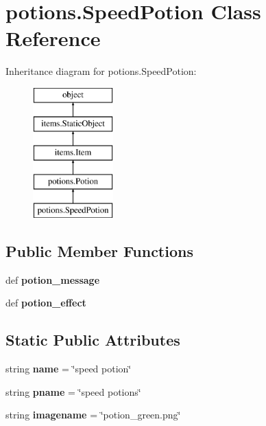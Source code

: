 \hypertarget{classpotions_1_1_speed_potion}{}\section{potions.\+Speed\+Potion Class Reference}
\label{classpotions_1_1_speed_potion}
Inheritance diagram for potions.\+Speed\+Potion\+:\begin{figure}[H]
\begin{center}
\leavevmode
\includegraphics[height=5.000000cm]{classpotions_1_1_speed_potion}
\end{center}
\end{figure}
\subsection*{Public Member Functions}
\begin{DoxyCompactItemize}
\item 
\hypertarget{classpotions_1_1_speed_potion_ad9eb0d697d01058de252d7c3b5cdd31d}{}def {\bfseries potion\+\_\+message}\label{classpotions_1_1_speed_potion_ad9eb0d697d01058de252d7c3b5cdd31d}

\item 
\hypertarget{classpotions_1_1_speed_potion_aebb1c2b45bcd48a039b1ceeedea9c14d}{}def {\bfseries potion\+\_\+effect}\label{classpotions_1_1_speed_potion_aebb1c2b45bcd48a039b1ceeedea9c14d}

\end{DoxyCompactItemize}
\subsection*{Static Public Attributes}
\begin{DoxyCompactItemize}
\item 
\hypertarget{classpotions_1_1_speed_potion_a4a7ff1a8b288e86f1d858d438794a7d8}{}string {\bfseries name} = \char`\"{}speed potion\char`\"{}\label{classpotions_1_1_speed_potion_a4a7ff1a8b288e86f1d858d438794a7d8}

\item 
\hypertarget{classpotions_1_1_speed_potion_ac176ff2d8efb4a30fd716ca792ee1c2d}{}string {\bfseries pname} = \char`\"{}speed potions\char`\"{}\label{classpotions_1_1_speed_potion_ac176ff2d8efb4a30fd716ca792ee1c2d}

\item 
\hypertarget{classpotions_1_1_speed_potion_a14c6c4fa9642878bda9818083390ec96}{}string {\bfseries imagename} = \char`\"{}potion\+\_\+green.\+png\char`\"{}\label{classpotions_1_1_speed_potion_a14c6c4fa9642878bda9818083390ec96}

\end{DoxyCompactItemize}
